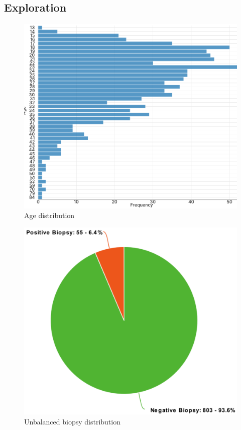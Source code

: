 \subsection{Exploration}
\begin{figure}
    \centerline{
        \includegraphics[width=0.4\paperwidth]{figures/age_dist.png}}
    \caption{Age distribution}
    \label{age_distribution}
\end{figure}

\begin{figure}
    \centerline{
        \includegraphics[width=0.3\paperwidth]{figures/class_unbalance.png}}
    \caption{Unbalanced biopsy distribution}
    \label{unbalanced_biopsy}
\end{figure}



